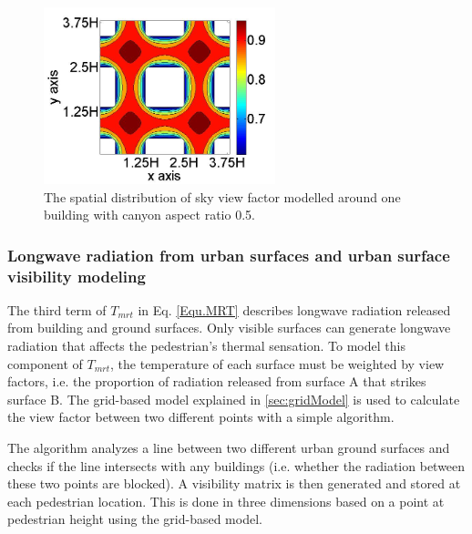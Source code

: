 \documentclass[smallextended]{svjour3}
\begin{document}
\begin{figure}[!h]
\graphicspath{ {image/} }
\centerline{\includegraphics[width=0.6\textwidth]{SVFSample.jpg}}
\caption{The spatial distribution of sky view factor modelled around one building with canyon aspect ratio 0.5.}
\label{Fig.SVFexample}
\end{figure}
\subsubsection{Longwave radiation from urban surfaces and urban surface visibility modeling}
\label{sec:visible}
The third term of $T_{mrt}$ in Eq. \ref{Equ.MRT} describes longwave radiation  released from building and ground surfaces. Only visible surfaces can generate longwave radiation that affects the pedestrian's thermal sensation. To model this component of $T_{mrt}$, the temperature of each surface must be weighted by view factors, i.e. the proportion of radiation released from surface A that strikes surface B. The grid-based model explained in \ref{sec:gridModel} is used to calculate the view factor between two different points with a simple algorithm.

The algorithm analyzes a line between two different urban ground surfaces and checks if the line intersects with any buildings (i.e. whether the radiation between these two points are blocked). A visibility matrix is then generated and stored at each pedestrian location. This is done in three dimensions based on a point at pedestrian height using the grid-based model. 
\end{document}
